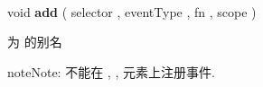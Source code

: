 \documentclass[letterpaper,10pt,english]{sphinxmanual}
\begin{document}

\begin{fulllineitems}
\label{api/core/event/on:Event.add}~
\begin{DUlineblock}{0em}
\item[] void \textbf{add} ( selector , eventType , fn , scope )
\item[] 为 {\hyperref[api/core/event/on:Event.on]{}} 的别名
\end{DUlineblock}

\begin{notice}{note}{Note:}
不能在  ,  ,  元素上注册事件.
\end{notice}

\end{fulllineitems}
\end{document}
